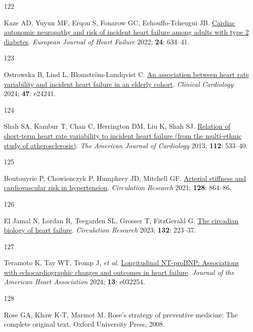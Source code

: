 \documentclass[
  a4paper,
  headsepline=true,
  open=left]{scrbook}
\newlength{\cslhangindent}
\newlength{\csllabelwidth}
\newlength{\cslentryspacingunit} %
\newenvironment{CSLReferences}[2] %
 {%
  \setlength{\parindent}{0pt}
  \ifodd #1
  \let\oldpar\par
  \def\par{\hangindent=\cslhangindent\oldpar}
  \fi
  \setlength{\parskip}{#2\cslentryspacingunit}
 }%
 {}
\newcommand{\CSLLeftMargin}[1]{\parbox[t]{\csllabelwidth}{#1}}
\newcommand{\CSLRightInline}[1]{\parbox[t]{\linewidth - \csllabelwidth}{#1}\break}
\begin{document}
\begin{CSLReferences}{0}{0}
\leavevmode{}%
\CSLLeftMargin{122 }%
\CSLRightInline{Kaze AD, Yuyun MF, Erqou S, Fonarow GC,
Echouffo-Tcheugui JB. \href{https://doi.org/10.1002/ejhf.2432}{Cardiac
autonomic neuropathy and risk of incident heart failure among adults
with type 2 diabetes}. \emph{European Journal of Heart Failure} 2022;
\textbf{24}: 634--41.}

\leavevmode{}%
\CSLLeftMargin{123 }%
\CSLRightInline{Ostrowska B, Lind L, Blomström-Lundqvist C.
\href{https://doi.org/10.1002/clc.24241}{An association between heart
rate variability and incident heart failure in an elderly cohort}.
\emph{Clinical Cardiology} 2024; \textbf{47}: e24241.}

\leavevmode{}%
\CSLLeftMargin{124 }%
\CSLRightInline{Shah SA, Kambur T, Chan C, Herrington DM, Liu K, Shah
SJ. \href{https://doi.org/10.1016/j.amjcard.2013.04.018}{Relation of
short-term heart rate variability to incident heart failure (from the
multi-ethnic study of atherosclerosis)}. \emph{The American Journal of
Cardiology} 2013; \textbf{112}: 533--40.}

\leavevmode{}%
\CSLLeftMargin{125 }%
\CSLRightInline{Boutouyrie P, Chowienczyk P, Humphrey JD, Mitchell GF.
\href{https://doi.org/10.1161/CIRCRESAHA.121.318061}{Arterial stiffness
and cardiovascular risk in hypertension}. \emph{Circulation Research}
2021; \textbf{128}: 864--86.}

\leavevmode{}%
\CSLLeftMargin{126 }%
\CSLRightInline{El Jamal N, Lordan R, Teegarden SL, Grosser T,
FitzGerald G. \href{https://doi.org/10.1161/CIRCRESAHA.122.321369}{The
circadian biology of heart failure}. \emph{Circulation Research} 2023;
\textbf{132}: 223--37.}

\leavevmode{}%
\CSLLeftMargin{127 }%
\CSLRightInline{Teramoto K, Tay WT, Tromp J, \emph{et al.}
\href{https://doi.org/10.1161/JAHA.123.032254}{Longitudinal NT{-}proBNP:
Associations with echocardiographic changes and outcomes in heart
failure}. \emph{Journal of the American Heart Association} 2024;
\textbf{13}: e032254.}

\leavevmode{}%
\CSLLeftMargin{128 }%
\CSLRightInline{Rose GA, Khaw K-T, Marmot M. Rose's strategy of
preventive medicine: The complete original text. Oxford University
Press, 2008.}


\end{CSLReferences}
\end{document}
